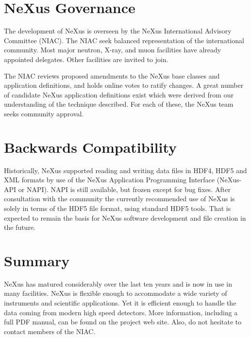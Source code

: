 \documentclass[%
 aip,
rsi,
 amsmath,amssymb,
 reprint,%
]{revtex4-1}
\begin{document}
\section{NeXus Governance}
  \label{sect_gov}

The development of NeXus is overseen
by the NeXus International Advisory Committee (NIAC).
The NIAC seek balanced representation of the international community.
Most major neutron, X-ray, and muon facilities have already appointed delegates.
Other facilities are invited to join.

The NIAC reviews proposed amendments to the NeXus base classes and
application definitions, and holds online votes to ratify changes.
A great number of candidate NeXus application definitions exist which were derived from our understanding of the technique described.
For each of these, the NeXus team seeks community approval. 


\section{Backwards Compatibility}

Historically, NeXus supported reading and writing data files in HDF4, HDF5 and
XML formats by use of the NeXus Application Programming Interface
(NeXus-API or NAPI).  NAPI is still available, but frozen except for bug fixes.
After consultation with the community the currently recommended use of
NeXus is solely in terms of the HDF5 file format, using standard HDF5 tools.
That is expected to remain the basis for NeXus software development and
file creation in the future.

\section{Summary}

NeXus has matured considerably over the last ten years and is now in use in many facilities. NeXus 
is flexible enough to accommodate a wide variety of instruments and scientific applications. 
Yet it is efficient enough to 
handle the data coming from modern high speed detectors.
More information, including a full PDF manual, can be found on
the project web site.\cite{nxwww}
Also, do not hesitate to contact members of the NIAC.


\nocite{*}
\end{document}
